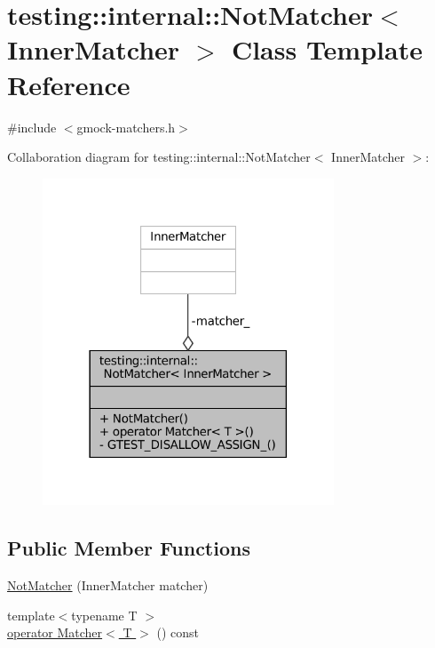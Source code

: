 \hypertarget{classtesting_1_1internal_1_1NotMatcher}{}\section{testing\+:\+:internal\+:\+:Not\+Matcher$<$ Inner\+Matcher $>$ Class Template Reference}
\label{classtesting_1_1internal_1_1NotMatcher}


{\ttfamily \#include $<$gmock-\/matchers.\+h$>$}



Collaboration diagram for testing\+:\+:internal\+:\+:Not\+Matcher$<$ Inner\+Matcher $>$\+:
\nopagebreak
\begin{figure}[H]
\begin{center}
\leavevmode
\includegraphics[width=246pt]{classtesting_1_1internal_1_1NotMatcher__coll__graph}
\end{center}
\end{figure}
\subsection*{Public Member Functions}
\begin{DoxyCompactItemize}
\item 
\hyperlink{classtesting_1_1internal_1_1NotMatcher_a77bd397c9974e4e49acb84eeb624dce1}{Not\+Matcher} (Inner\+Matcher matcher)
\item 
{\footnotesize template$<$typename T $>$ }\\\hyperlink{classtesting_1_1internal_1_1NotMatcher_a87ad7beadf9def58cc053229e99e8625}{operator Matcher$<$ T $>$} () const
\end{DoxyCompactItemize}
